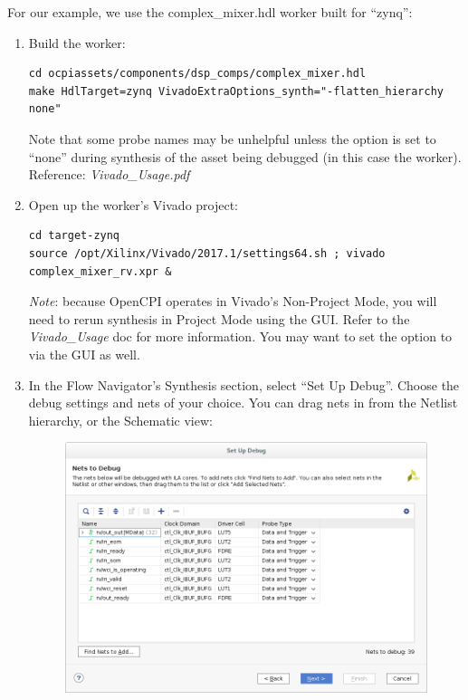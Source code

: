 \begin{flushleft}
	For our example, we use the complex\_mixer.hdl worker built for ``zynq'':
	\begin{enumerate}
		\item Build the worker:
\begin{lstlisting}
cd ocpiassets/components/dsp_comps/complex_mixer.hdl
make HdlTarget=zynq VivadoExtraOptions_synth="-flatten_hierarchy none"
\end{lstlisting}
Note that some probe names may be unhelpful unless the  option is set to ``none''
during synthesis of the asset being debugged (in this case the worker). Reference: \textit{Vivado\_Usage.pdf}
		\item Open up the worker's Vivado project:
\begin{lstlisting}
cd target-zynq
source /opt/Xilinx/Vivado/2017.1/settings64.sh ; vivado complex_mixer_rv.xpr &
\end{lstlisting}
			\textit{Note}: because OpenCPI operates in Vivado's Non-Project Mode, you will need to rerun synthesis
			in Project Mode using the GUI. Refer to the \textit{Vivado\_Usage} doc for more information. You may want to
			set the  option to  via the GUI as well.
		\item In the Flow Navigator's Synthesis section, select ``Set Up Debug''. Choose the debug settings and nets of your choice. You can drag nets in from the Netlist hierarchy, or the Schematic view:
			\begin{figure}[H]
				\centerline{\includegraphics[scale=0.6]			{figures/xilinx_vivado_2017_set_up_debug}}

\end{figure}
\end{enumerate}
\end{flushleft}
